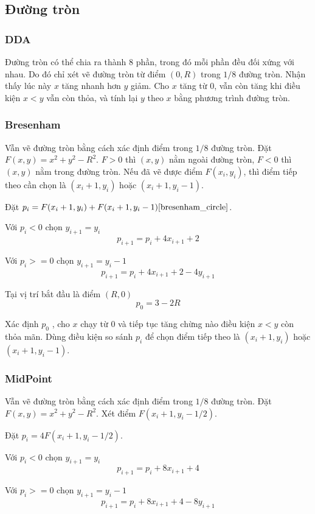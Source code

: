 \documentclass[12pt]{article}
\begin{document}
\subsection{Đường tròn}

\subsubsection{DDA}
Đường tròn có thể chia ra thành \(8\) phần, trong đó mỗi phần đều đối xứng với nhau.
Do đó chỉ xét vẽ đường tròn từ điểm \((0, R)\) trong \(1/8\) đường tròn.
Nhận thấy lúc này \(x\) tăng nhanh hơn \(y\) giảm. Cho \(x\) tăng từ \(0\),
vẫn còn tăng khi điều kiện \(x < y\) vẫn còn thỏa, và tính lại \(y\) theo \(x\) bằng phương trình đường tròn.

\subsubsection{Bresenham}
Vẫn vẽ đường tròn bằng cách xác định điểm trong \(1/8\) đường tròn.
Đặt \(F(x, y) = x^2 + y^2 - R^2\). \(F > 0\) thì \((x, y)\) nằm ngoài đường tròn,
\(F < 0\) thì \((x, y)\) nằm trong đường tròn. Nếu đã vẽ được điểm \(F(x_i, y_i)\),
thì điểm tiếp theo cần chọn là \((x_i + 1, y_i)\) hoặc \((x_i + 1, y_i - 1)\).

Đặt \(p_i = F(x_i + 1, y_i) + F(x_i + 1, y_i - 1) \cite{bresenham_circle}\).

Với \(p_i < 0\) chọn \(y_{i+1} = y_i\)
\[p_{i+1} = p_i + 4x_{i+1} + 2\]

Với \(p_i >= 0\) chọn \(y_{i+1} = y_i - 1\)
\[p_{i+1} = p_i + 4x_{i+1} + 2 - 4y_{i+1}\]

Tại vị trí bắt đầu là điểm \((R, 0)\)
\[p_0 = 3 - 2R\]

Xác định \(p_0\) , cho \(x\) chạy từ \(0\) và tiếp tục tăng chừng nào điều kiện \(x < y\) còn thỏa mãn.
Dùng điều kiện so sánh \(p_i\) để chọn điểm tiếp theo là \((x_i + 1, y_i)\) hoặc \((x_i + 1, y_i - 1)\).

\subsubsection{MidPoint}
Vẫn vẽ đường tròn bằng cách xác định điểm trong \(1/8\) đường tròn.
Đặt \(F(x, y) = x^2 + y^2 - R^2\). Xét điểm \(F(x_i + 1, y_i - 1/2)\).

Đặt \(p_i = 4F(x_i + 1, y_i - 1/2)\).

Với \(p_i < 0\) chọn \(y_{i+1} = y_i\)
\[p_{i+1} = p_i + 8x_{i+1} + 4\]

Với \(p_i >= 0\) chọn \(y_{i+1} = y_i - 1\)
\[p_{i+1} = p_i + 8x_{i+1} + 4 - 8y_{i+1}\]
\end{document}
